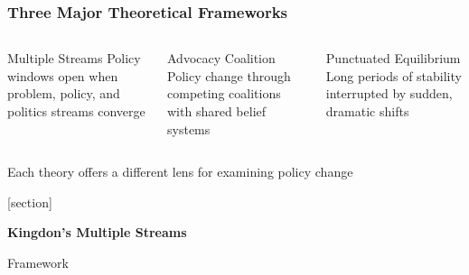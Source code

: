 \documentclass[10pt]{beamer}
\begin{document}
\begin{frame}
\frametitle{Three Major Theoretical Frameworks}

\begin{columns}
  \begin{column}{0.32\textwidth}
    \begin{block}{\textcolor{streamblue}{Multiple Streams}}
      \pause
      \centering
      Policy windows open when problem, policy, and politics streams converge
    \end{block}
  \end{column}

  \begin{column}{0.32\textwidth}
    \begin{block}{\textcolor{coalitionred}{Advocacy Coalition}}
      \pause
      \centering
      Policy change through competing coalitions with shared belief systems
    \end{block}
  \end{column}

  \begin{column}{0.32\textwidth}
    \begin{block}{\textcolor{punctuationorange}{Punctuated Equilibrium}}
      \pause
      \centering
      Long periods of stability interrupted by sudden, dramatic shifts
    \end{block}
  \end{column}
\end{columns}

\pause
\vspace{1cm}
\centering
Each theory offers a different lens for examining policy change

\end{frame}

{
[section]
\begin{frame}[plain]
  \vspace{2cm}
  \begin{center}
    {\Huge\color{white}\textbf{Kingdon's Multiple Streams}}

    \vspace{0.5cm}
    {\Large\color{white}Framework}
  \end{center}
\end{frame}
}
\end{document}
